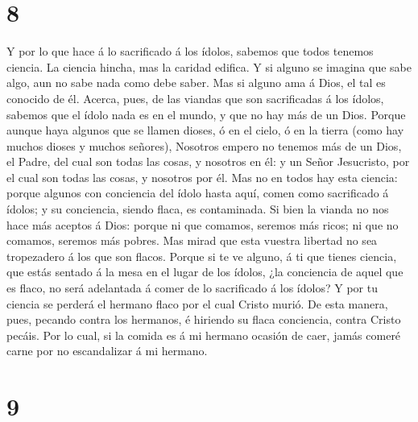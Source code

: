 \hypertarget{section-7}{%
\section{8}\label{section-7}}

 Y por lo que hace á lo sacrificado á los ídolos, sabemos
que todos tenemos ciencia. La ciencia hincha, mas la caridad edifica.
 Y si alguno se imagina que sabe algo, aun no sabe nada
como debe saber.  Mas si alguno ama á Dios, el tal es
conocido de él.  Acerca, pues, de las viandas que son
sacrificadas á los ídolos, sabemos que el ídolo nada es en el mundo, y
que no hay más de un Dios.  Porque aunque haya algunos que
se llamen dioses, ó en el cielo, ó en la tierra (como hay muchos dioses
y muchos señores),  Nosotros empero no tenemos más de un
Dios, el Padre, del cual son todas las cosas, y nosotros en él: y un
Señor Jesucristo, por el cual son todas las cosas, y nosotros por él.
 Mas no en todos hay esta ciencia: porque algunos con
conciencia del ídolo hasta aquí, comen como sacrificado á ídolos; y su
conciencia, siendo flaca, es contaminada.  Si bien la
vianda no nos hace más aceptos á Dios: porque ni que comamos, seremos
más ricos; ni que no comamos, seremos más pobres.  Mas
mirad que esta vuestra libertad no sea tropezadero á los que son flacos.
 Porque si te ve alguno, á ti que tienes ciencia, que
estás sentado á la mesa en el lugar de los ídolos, ¿la conciencia de
aquel que es flaco, no será adelantada á comer de lo sacrificado á los
ídolos?  Y por tu ciencia se perderá el hermano flaco por
el cual Cristo murió.  De esta manera, pues, pecando
contra los hermanos, é hiriendo su flaca conciencia, contra Cristo
pecáis.  Por lo cual, si la comida es á mi hermano
ocasión de caer, jamás comeré carne por no escandalizar á mi hermano.

\hypertarget{section-8}{%
\section{9}\label{section-8}}


